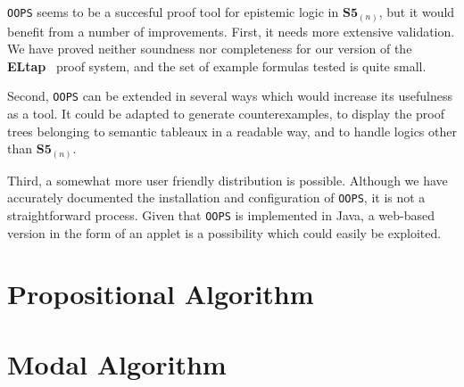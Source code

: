\documentclass[11pt,a4paper]{article}
\begin{document}
{\tt OOPS} seems to be a succesful proof tool for epistemic logic in  $\textbf{S5}_{(n)}$, but it would benefit from a number of improvements. First, it needs more extensive validation. We have proved neither soundness nor completeness for our version of the {\bf ELtap}~\cite{these} proof system, and the set of example formulas tested is quite small.
\par Second, {\tt OOPS} can be extended in several ways which would increase its usefulness as a tool. It could be adapted to generate counterexamples, to display the proof trees belonging to semantic tableaux in a readable way, and to handle logics other than $\textbf{S5}_{(n)}$.
\par Third, a somewhat more user friendly distribution is possible. Although we have accurately documented the installation and configuration of {\tt OOPS}, it is not a straightforward process. Given that {\tt OOPS} is implemented in Java, a web-based version in the form of an applet is a possibility which could easily be exploited.

\newpage


\appendix
\section{Propositional Algorithm}
\label{app:propalg}

\section{Modal Algorithm}
\label{app:modalg}

\end{document}
